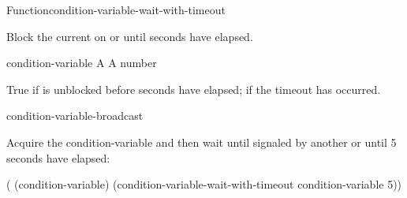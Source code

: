 \begin{functiondoc}{Function}{condition-variable-wait-with-timeout}%
  {
    \returns{} }

%

\fnsyntax

\fnpurpose Block the current  on  or until
 seconds have elapsed.

\fnpackage {}

\fnmodule {}

\fnargs
\begin{args}{condition-variable}
 A 
\arg[seconds] A number
\end{args}

\fnreturns True if  is unblocked before
 seconds have elapsed; \nil{} if the timeout has occurred.

\fnerrors
\nocvlock{}
\par
\nothreads{}

\begin{alsos}{condition-variable-broadcast}
\end{alsos}

%
\fnexample Acquire the condition-variable  and then wait until
signaled by another  or until 5 seconds have elapsed:
%
\W\supp
\begin{example}
  ( (condition-variable)
    (condition-variable-wait-with-timeout condition-variable 5))
\end{example}

\end{functiondoc}



